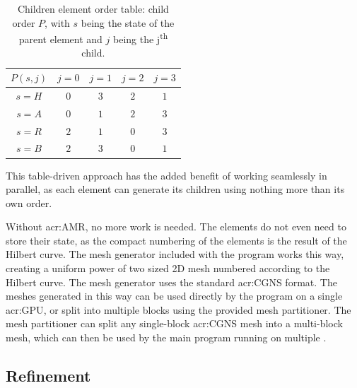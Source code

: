 \begin{table}[H]
    \begin{center}
        \begin{tabular}{ c | c c c c} 
            \(P( s, j )\) & \(j = 0\) & \(j = 1\) & \(j = 2\) & \(j = 3\)  \\
            \hline
            \(s = H\) & \textcolor{vs_red}{\(0\)} & \textcolor{vs_red}{\(3\)} & \textcolor{vs_red}{\(2\)} & \textcolor{vs_red}{\(1\)} \\ 
            \(s = A\) & \textcolor{vs_blue}{\(0\)} & \textcolor{vs_blue}{\(1\)} & \textcolor{vs_blue}{\(2\)} & \textcolor{vs_blue}{\(3\)} \\
            \(s = R\) & \textcolor{vs_teal}{\(2\)} & \textcolor{vs_teal}{\(1\)} & \textcolor{vs_teal}{\(0\)} & \textcolor{vs_teal}{\(3\)} \\
            \(s = B\) & \textcolor{vs_plum}{\(2\)} & \textcolor{vs_plum}{\(3\)} & \textcolor{vs_plum}{\(0\)} & \textcolor{vs_plum}{\(1\)} \\
        \end{tabular}
        
        \caption{Children element order table: child order \(P\), with \(s\) being the state of the parent element and \(j\) being the j\textsuperscript{th} child.}\label{table:children_ordering}
    \end{center}
\end{table}

This table-driven approach has the added benefit of working seamlessly in parallel, as each element
can generate its children using nothing more than its own order.

Without \acrlong{acr:AMR}, no more work is needed. The elements do not even need to store their
state, as the compact numbering of the elements is the result of the Hilbert curve. The mesh
generator included with the program works this way, creating a uniform power of two sized 2D mesh
numbered according to the Hilbert curve. The mesh generator uses the standard \acrshort{acr:CGNS}
format. The meshes generated in this way can be used directly by the program on a single
\acrshort{acr:GPU}, or split into multiple blocks using the provided mesh partitioner. The mesh
partitioner can split any single-block \acrshort{acr:CGNS} mesh into a multi-block mesh, which can
then be used by the main program running on multiple .

\subsection{Refinement}\label{section:load_balancing:hilbert_curve:refinement}

